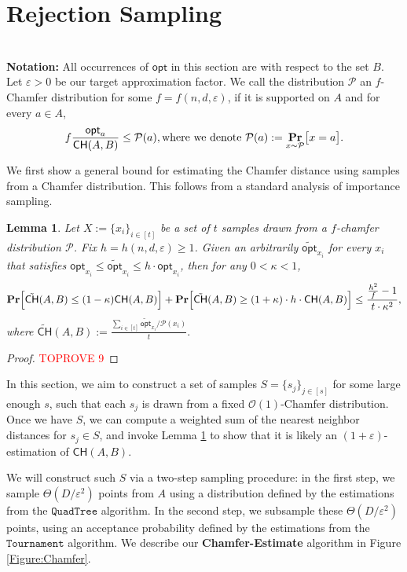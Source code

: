 \documentclass[11pt]{article}
\newcommand{\eps}{\varepsilon}
\theoremstyle{plain}
\newtheorem{lem}[theorem]{Lemma}
\newcommand{\calP}{\mathcal{P}} \newcommand{\calD}{\mathcal{D}}
\newcommand{\OO}{\mathcal{O}}
\newcommand{\ppr}[2]{\underset{#1}{\text{\bf Pr}} \normalfont\bigl[ #2 \bigr]}
\newcommand{\bpr}[1]{\text{\bf Pr}\normalfont\Bigl[ #1 \Bigr]}
\newcommand{\opt}{\mathsf{opt}}
\newcommand{\Tournament}{\texttt{Tournament}}
\newcommand{\QuadTree}{\texttt{QuadTree}} \usepackage{microtype}
\begin{document}
 \section{Rejection Sampling}
\ \\
{\bf Notation:} All occurrences of $\opt$ in this section are with respect to the set $B$. Let $\eps > 0$ be our target approximation factor. We call the distribution $\calP$ an $f$-Chamfer distribution for some $f = f(n, d, \eps)$, if it is supported on $A$ and for every $a \in A$,
\[f\frac{\opt_a}{\mathsf{CH}(A, B)} \leq \calP(a), \text{where we denote } \calP(a) := \ppr{x \sim \calP}{x = a}.\] 

We first show a general bound for estimating the Chamfer distance using samples from a Chamfer distribution. This follows from a standard analysis of importance sampling. 
\begin{lem}\label{Lemma:general}
    Let $X := \{x_i\}_{i \in [t]}$ be a set of $t$ samples drawn from a $f$-chamfer distribution $\calP$. Fix $h = h(n, d, \eps) \geq 1$. Given an arbitrarily $\tilde{\opt}_{x_i}$ for every $x_i$ that satisfies $\opt_{x_i} \leq \tilde{\opt}_{x_i} \leq h\cdot \opt_{x_i}$, then for any $0 < \kappa < 1$,
    \[\bpr{\tilde{\mathsf{CH}}(A, B) \leq (1-\kappa) \mathsf{CH}(A, B) } +  \bpr{\tilde{\mathsf{CH}}(A, B) \geq (1+\kappa) \cdot h \cdot \mathsf{CH}(A, B)} \leq \frac{\frac{h^2}{f}-1}{t \cdot \kappa^2}, \] where
    $\tilde{\mathsf{CH}}(A, B) := \frac{\sum_{i \in [t]}\tilde{\opt}_{x_i} / \calP(x_i) }{t }.$
\end{lem}

\begin{proof}\textcolor{red}{TOPROVE 9}\end{proof}


In this section, we aim to construct a set of samples $S = \{s_j\}_{j \in [s]}$ for some large enough $s$, such that
each $s_j$ is drawn from a fixed $\OO(1)$-Chamfer distribution. Once we have $S$, we can compute a weighted sum of the nearest neighbor distances for $s_j \in S$, and invoke Lemma \ref{Lemma:general} to show that it is likely an $(1+\eps)$-estimation of $\mathsf{CH}(A, B)$.

We will construct such $S$ via a two-step sampling procedure: in the first step, we sample $\Theta({{D}}/\eps^2)$ points from $A$ using a distribution defined by the estimations from the $\QuadTree$ algorithm. In the second step, we subsample these $\Theta({{D}}/\eps^2)$ points, using an acceptance probability defined by the estimations from the $\Tournament$ algorithm. We describe our \textbf{Chamfer-Estimate} algorithm in Figure \ref{Figure:Chamfer}.
\end{document}
